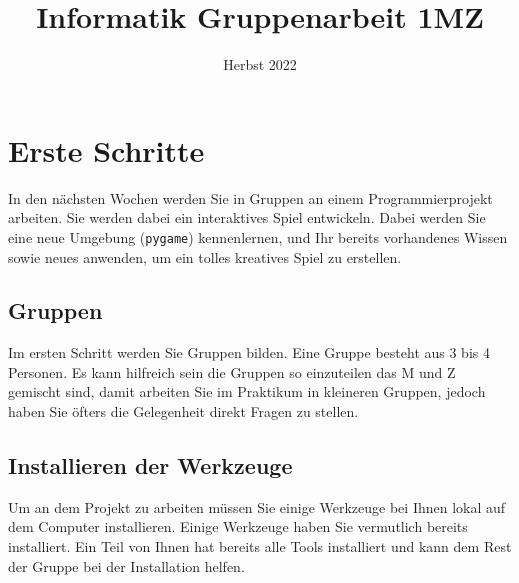 \documentclass[11pt,a4paper]{report}
\title{Informatik Gruppenarbeit 1MZ}
\date{Herbst 2022}
\begin{document}
\maketitle

\newpage
\section{Erste Schritte}

In den nächsten Wochen werden Sie in Gruppen an einem Programmierprojekt
arbeiten. Sie werden dabei ein interaktives Spiel entwickeln. Dabei werden Sie
eine neue Umgebung (\verb|pygame|) kennenlernen, und Ihr bereits vorhandenes
Wissen sowie neues anwenden, um ein tolles kreatives Spiel zu erstellen.

\subsection{Gruppen}

Im ersten Schritt werden Sie Gruppen bilden. Eine Gruppe besteht aus 3 bis 4
Personen. Es kann hilfreich sein die Gruppen so einzuteilen das M und Z
gemischt sind, damit arbeiten Sie im Praktikum in kleineren Gruppen, jedoch
haben Sie öfters die Gelegenheit direkt Fragen zu stellen.

\subsection{Installieren der Werkzeuge}

Um an dem Projekt zu arbeiten müssen Sie einige Werkzeuge bei Ihnen lokal auf
dem Computer installieren. Einige Werkzeuge haben Sie vermutlich bereits
installiert. Ein Teil von Ihnen hat bereits alle Tools installiert und kann dem
Rest der Gruppe bei der Installation helfen.
\end{document}
